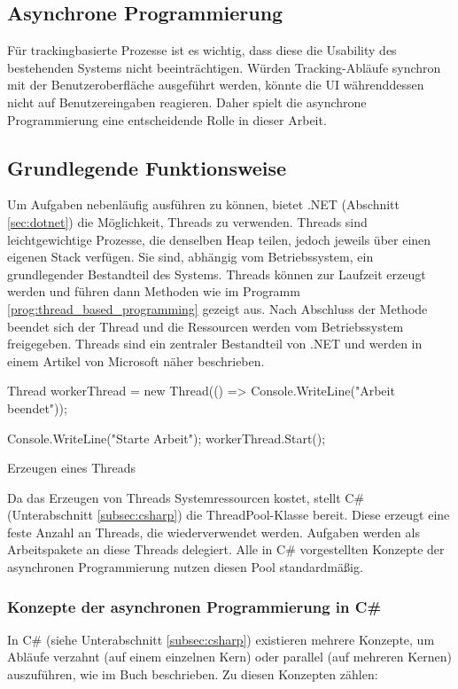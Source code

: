 \subsection{Asynchrone Programmierung}
\label{subsec:async}
Für trackingbasierte Prozesse ist es wichtig, dass diese die Usability des bestehenden Systems nicht beeinträchtigen. Würden Tracking-Abläufe synchron mit der Benutzeroberfläche ausgeführt werden, könnte die UI währenddessen nicht auf Benutzereingaben reagieren. Daher spielt die asynchrone Programmierung eine entscheidende Rolle in dieser Arbeit.

\subsection{Grundlegende Funktionsweise}
Um Aufgaben nebenläufig ausführen zu können, bietet .NET (Abschnitt \ref{sec:dotnet}) die Möglichkeit, Threads zu verwenden. Threads sind leichtgewichtige Prozesse, die denselben Heap teilen, jedoch jeweils über einen eigenen Stack verfügen. Sie sind, abhängig vom Betriebssystem, ein grundlegender Bestandteil des Systems. Threads können zur Laufzeit erzeugt werden und führen dann Methoden wie im Programm \ref{prog:thread_based_programming} gezeigt aus. Nach Abschluss der Methode beendet sich der Thread und die Ressourcen werden vom Betriebssystem freigegeben. Threads sind ein zentraler Bestandteil von .NET und werden in einem Artikel von Microsoft \cite{Microsoft_ThreadsAndThreading} näher beschrieben.

\begin{program}[H]
\begin{CsCode}
Thread workerThread = new Thread(() => Console.WriteLine("Arbeit beendet"));

Console.WriteLine("Starte Arbeit");
workerThread.Start();
\end{CsCode}
\caption{Erzeugen eines Threads}
\label{prog:thread_based_programming}
\end{program}

Da das Erzeugen von Threads Systemressourcen kostet, stellt C\# (Unterabschnitt \ref{subsec:csharp}) die ThreadPool-Klasse bereit. Diese erzeugt eine feste Anzahl an Threads, die wiederverwendet werden. Aufgaben werden als Arbeitspakete an diese Threads delegiert. Alle in C\# vorgestellten Konzepte der asynchronen Programmierung nutzen diesen Pool standardmäßig.

\subsubsection{Konzepte der asynchronen Programmierung in C\#}
In C\# (siehe Unterabschnitt \ref{subsec:csharp}) existieren mehrere Konzepte, um Abläufe verzahnt (auf einem einzelnen Kern) oder parallel (auf mehreren Kernen) auszuführen, wie im Buch \cite{sarcar2004design} beschrieben. Zu diesen Konzepten zählen:

